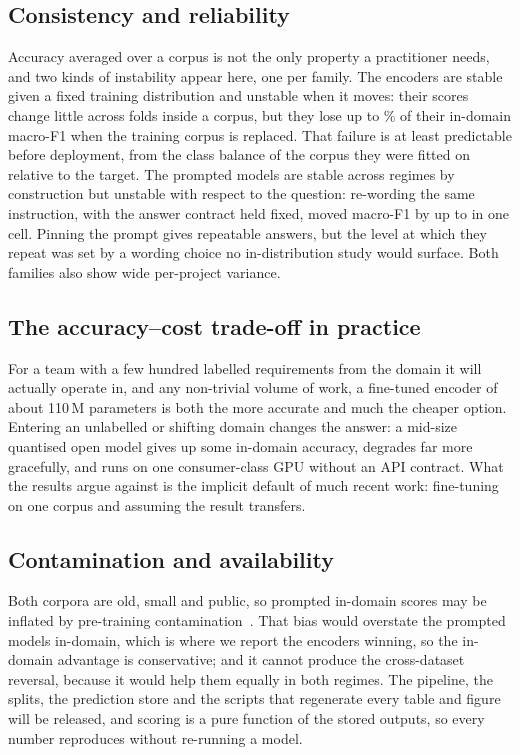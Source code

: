 \documentclass[conference]{IEEEtran}
\newcommand{\Fm}{macro-F1}
\begin{document}
\subsection{Consistency and reliability}
Accuracy averaged over a corpus is not the only property a practitioner needs,
and two kinds of instability appear here, one per family. The encoders are stable
given a fixed training distribution and unstable when it moves: their scores
change little across folds inside a corpus, but they lose up to \nDropXDmax\% of
their in-domain \Fm{} when the training corpus is replaced. That failure is at
least predictable before deployment, from the class balance of the corpus they
were fitted on relative to the target. The prompted models are stable across
regimes by construction but unstable with respect to the question: re-wording the
same instruction, with the answer contract held fixed, moved \Fm{} by up to
\nSpreadMax{} in one cell. Pinning the prompt gives repeatable answers, but the
level at which they repeat was set by a wording choice no in-distribution study
would surface. Both families also show wide per-project variance.

\subsection{The accuracy--cost trade-off in practice}
For a team with a few hundred labelled requirements from the domain it will
actually operate in, and any non-trivial volume of work, a fine-tuned encoder of
about 110\,M parameters is both the more accurate and much the cheaper option.
Entering an unlabelled or shifting domain changes the answer: a mid-size
quantised open model gives up some in-domain accuracy, degrades far more
gracefully, and runs on one consumer-class GPU without an API contract. What the
results argue against is the implicit default of much recent work: fine-tuning on
one corpus and assuming the result transfers.

\subsection{Contamination and availability}
Both corpora are old, small and public, so prompted in-domain scores may be
inflated by pre-training contamination~\cite{sainz2023}. That bias would
overstate the prompted models in-domain, which is where we report the encoders
winning, so the in-domain advantage is conservative; and it cannot produce the
cross-dataset reversal, because it would help them equally in both regimes. The
pipeline, the splits, the prediction store and the scripts that regenerate every
table and figure will be released, and scoring is a pure function of the stored
outputs, so every number reproduces without re-running a model.
\end{document}
